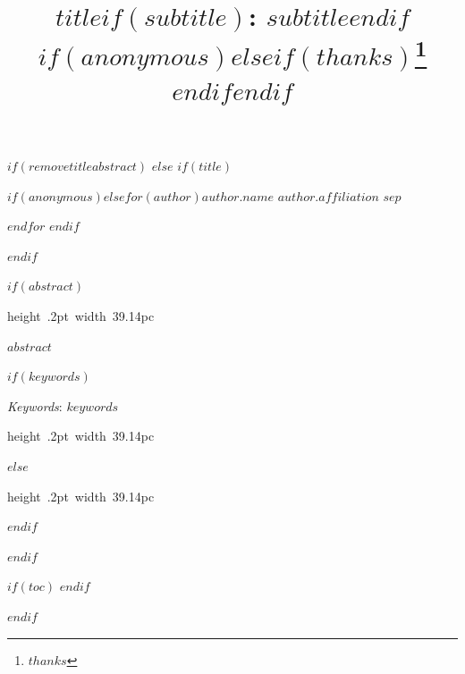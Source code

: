 \documentclass[$if(fontsize)$$fontsize$,$endif$$if(lang)$$babel-lang$,$endif$$if(papersize)$$papersize$,$endif$$for(classoption)$$classoption$$sep$,$endfor$]{article}
\title{$title$$if(subtitle)$: $subtitle$$endif$ $if(anonymous)$$else$$if(thanks)$\thanks{$thanks$} $endif$$endif$ }
\date{}
\newcommand*{\authorfont}{\fontfamily{phv}\selectfont}
\renewenvironment{abstract}
 {{%
    \setlength{\leftmargin}{0mm}
    \setlength{\rightmargin}{\leftmargin}%
  }%
  \relax}
 {\endlist}
\begin{document}
	

$if(removetitleabstract)$
$else$
$if(title)$

{%
\setlength{\parindent}{0pt}
\thispagestyle{plain}
{\fontsize{18}{20}\selectfont\raggedright 
\maketitle  %

}

{
   \vskip 13.5pt\relax \normalsize\fontsize{11}{12} 
$if(anonymous)$\hfill $else$$for(author)$\textbf{\authorfont $author.name$} \hskip 15pt \emph{\small $author.affiliation$}  $sep$ \par $endfor$ $endif$

}

}


$endif$



$if(abstract)$



\begin{abstract}

    \hbox{\vrule height .2pt width 39.14pc}

    \vskip 8.5pt %

\noindent $abstract$

$if(keywords)$

\vskip 8.5pt \noindent \emph{Keywords}: $keywords$ \par

    \hbox{\vrule height .2pt width 39.14pc}


$else$

    \hbox{\vrule height .2pt width 39.14pc}

$endif$

\end{abstract}

$endif$

\vskip -8.5pt

$if(toc)$
{
\hypersetup{linkcolor=black}
\setcounter{tocdepth}{$toc-depth$}
\tableofcontents
}
$endif$

$endif$ %
\end{document}
